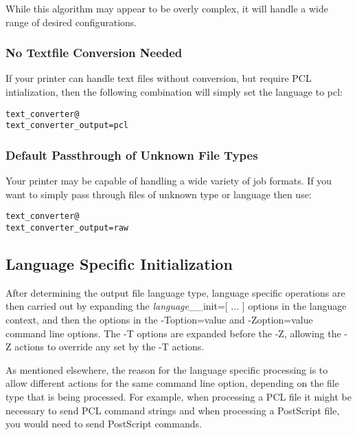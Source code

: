 \documentclass[a4paper]{article}
\begin{document}
While this algorithm may appear to be overly complex, it
will handle a wide range of desired configurations.


\subsubsection{No Textfile Conversion Needed}

If your printer can handle text files without conversion,
but require PCL intialization, then the following combination
will simply set the language to
{\ttfamily pcl}:
\begin{tscreen}
\begin{verbatim}
text_converter@
text_converter_output=pcl
\end{verbatim}
\end{tscreen}



\subsubsection{Default Passthrough of Unknown File Types}

Your printer may be capable of handling a wide variety of job
formats.  If you want to simply pass through files of
unknown type or language then use:
\begin{tscreen}
\begin{verbatim}
text_converter@
text_converter_output=raw
\end{verbatim}
\end{tscreen}



\subsection{Language Specific Initialization
\label{languageinit}}

After determining the output file language type,
language specific operations are then carried out by
expanding the
{\itshape language\_\/}{\ttfamily \_init=[ ... ]}
options in the language context,
and then the options in the
{\ttfamily -Toption=value}
and
{\ttfamily -Zoption=value}
command line options.
The 
{\ttfamily -T}
options are expanded before the
{\ttfamily -Z},
allowing the 
{\ttfamily -Z} actions to override any set by the
{\ttfamily -T} actions.

As mentioned elsewhere,
the reason for the language specific processing is to allow
different actions for the same command line option,
depending on the file type that is being processed.
For example,  when processing a PCL file it might be necessary to send
PCL command strings and when processing a PostScript file,
you would need to send PostScript commands.
\end{document}
